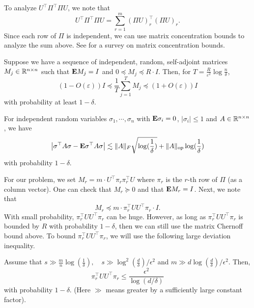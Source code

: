 To analyze $U^{\top}\Pi^{\top}\Pi U$, we note that 
\[
U^{\top}\Pi^{\top}\Pi U=\sum^{m}_{r=1}(\Pi U)^{\top}_{r}(\Pi U)_{r}.
\]
Since each row of $\Pi$ is independent, we can use matrix concentration
bounds to analyze the sum above. See \cite{tropp2015introduction}
for a survey on matrix concentration bounds.
\begin{thm}
\label{thm:matrix-chernoff}Suppose we have a sequence of independent,
random, self-adjoint matrices $M_{j}\in\mathbb{R}^{n\times n}$ such that
$\mathbf{E} M_{j}=I$ and $0\preceq M_{j}\preceq R\cdot I$. Then, for $T=\frac{R}{\varepsilon^{2}}\log\frac{n}{\delta}$,
\[
(1-O(\varepsilon))I\preceq\frac{1}{T}\sum^{T}_{j=1}M_{j}\preceq(1+O(\varepsilon))I
\]
with probability at least $1-\delta$.
\end{thm}

\begin{lem}
For independent random variables $\sigma_{1},\cdots,\sigma_{n}$
with $\mathbf{E}\sigma_{i}=0$, $|\sigma_{i}|\leq1$ and $A\in\mathbb{R}^{n\times n}$,
we have 
\[
\left|\sigma^{\top}A\sigma-\mathbf{E}\sigma^{\top}A\sigma\right|\lesssim\|A\|_{F}\sqrt{\log(\frac{1}{\delta})}+\|A\|_{\mathrm{op}}\log(\frac{1}{\delta})
\]
with probability $1-\delta$.
\end{lem}

For our problem, we set $M_{r}=m\cdot U^{\top}\pi_{r}\pi^{\top}_{r}U$
where $\pi_{r}$ is the $r$-th row of $\Pi$ (as a column vector).
One can check that $M_{r}\succeq0$ and that $\mathbf{E} M_{r}=I$. Next,
we note that
\begin{equation}
M_{r}\preceq m\cdot\pi^{\top}_{r}UU^{\top}\pi_{r}\cdot I.\label{matrix_ub}
\end{equation}
With small probability, $\pi^{\top}_{r}UU^{\top}\pi_{r}$ can be huge.
However, as long as $\pi^{\top}_{r}UU^{\top}\pi_{r}$ is bounded by
$R$ with probability $1-\delta$, then we can still use the matrix
Chernoff bound above. To bound $\pi^{\top}_{r}UU^{\top}\pi_{r}$,
we will use the following large deviation inequality.

\begin{lem}
Assume that $s\gg\frac{m}{n}\log(\frac{1}{\delta}),\quad s\gg\log^{2}(\frac{d}{\delta})/\epsilon^{2}$
and $m\gg d\log(\frac{d}{\delta})/\epsilon^{2}$. Then, 
\[
\pi^{\top}_{r}UU^{\top}\pi_{r}\leq\frac{\epsilon^{2}}{\log(d/\delta)}
\]
with probability $1-\delta$. (Here $\gg$ means greater by a sufficiently
large constant factor).
\end{lem}

